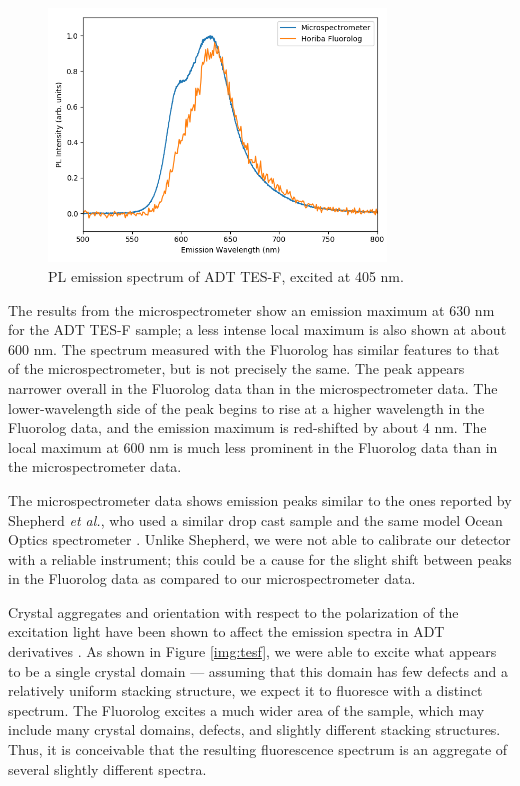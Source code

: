 \begin{figure}[H]
    \centering
    \includegraphics[width=0.8\textwidth]{./img/tesf-2.png}%
    \caption[PL emission spectrum of ADT TES-F, excited at 405nm.]{PL emission spectrum of ADT TES-F, excited at 405 nm.}
    \label{fig:pl-adt-tesf}
\end{figure}

The results from the microspectrometer show an emission maximum at 630 nm for the ADT TES-F sample; a less intense local maximum is also shown at about 600 nm. The spectrum measured with the Fluorolog has similar features to that of the microspectrometer, but is not precisely the same. The peak appears narrower overall in the Fluorolog data than in the microspectrometer data. The lower-wavelength side of the peak begins to rise at a higher wavelength in the Fluorolog data, and the emission maximum is red-shifted by about 4 nm. The local maximum at 600 nm is much less prominent in the Fluorolog data than in the microspectrometer data.

The microspectrometer data shows emission peaks similar to the ones reported by Shepherd \emph{et al.}, who used a similar drop cast sample and the same model Ocean Optics spectrometer \cite{e._b._shepherd_effect_2011}. Unlike Shepherd, we were not able to calibrate our detector with a reliable instrument; this could be a cause for the slight shift between peaks in the Fluorolog data as compared to our microspectrometer data.

Crystal aggregates and orientation with respect to the polarization of the excitation light have been shown to affect the emission spectra in ADT derivatives \cite{lam_polarization_2018}. As shown in Figure \ref{img:tesf}, we were able to excite what appears to be a single crystal domain --- assuming that this domain has few defects and a relatively uniform stacking structure, we expect it to fluoresce with a distinct spectrum. The Fluorolog excites a much wider area of the sample, which may include many crystal domains, defects, and slightly different stacking structures. Thus, it is conceivable that the resulting fluorescence spectrum is an aggregate of several slightly different spectra.

